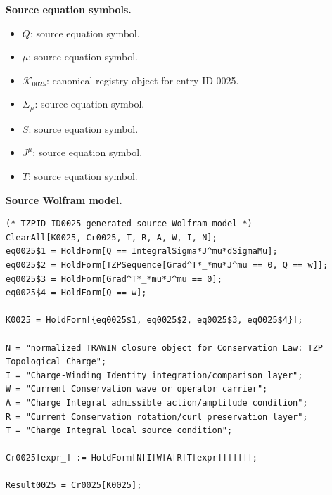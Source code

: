 \begin{minipage}[t]{0.49\linewidth}
\begingroup
\small
\raggedright
\textbf{Source equation symbols.}\par
\begin{itemize}[leftmargin=1.35em,itemsep=1pt,topsep=1pt,parsep=0pt]
    \item $Q$: source equation symbol.
    \item $\mu$: source equation symbol.
    \item $\mathcal{K}_{0025}$: canonical registry object for entry ID 0025.
    \item $\Sigma_{\mu}$: source equation symbol.
    \item $S$: source equation symbol.
    \item $J^{\mu}$: source equation symbol.
    \item $T$: source equation symbol.
\end{itemize}
\endgroup
\end{minipage}\hfill
\begin{minipage}[t]{0.47\linewidth}
\begingroup
\scriptsize
\raggedright
\textbf{Source Wolfram model.}\par
\begin{Verbatim}[fontsize=\tiny,breaklines=true,breakanywhere=true]
(* TZPID ID0025 generated source Wolfram model *)
ClearAll[K0025, Cr0025, T, R, A, W, I, N];
eq0025$1 = HoldForm[Q == IntegralSigma*J^mu*dSigmaMu];
eq0025$2 = HoldForm[TZPSequence[Grad^T*_*mu*J^mu == 0, Q == w]];
eq0025$3 = HoldForm[Grad^T*_*mu*J^mu == 0];
eq0025$4 = HoldForm[Q == w];

K0025 = HoldForm[{eq0025$1, eq0025$2, eq0025$3, eq0025$4}];

N = "normalized TRAWIN closure object for Conservation Law: TZP Topological Charge";
I = "Charge-Winding Identity integration/comparison layer";
W = "Current Conservation wave or operator carrier";
A = "Charge Integral admissible action/amplitude condition";
R = "Current Conservation rotation/curl preservation layer";
T = "Charge Integral local source condition";

Cr0025[expr_] := HoldForm[N[I[W[A[R[T[expr]]]]]]];

Result0025 = Cr0025[K0025];
\end{Verbatim}
\endgroup
\end{minipage}


